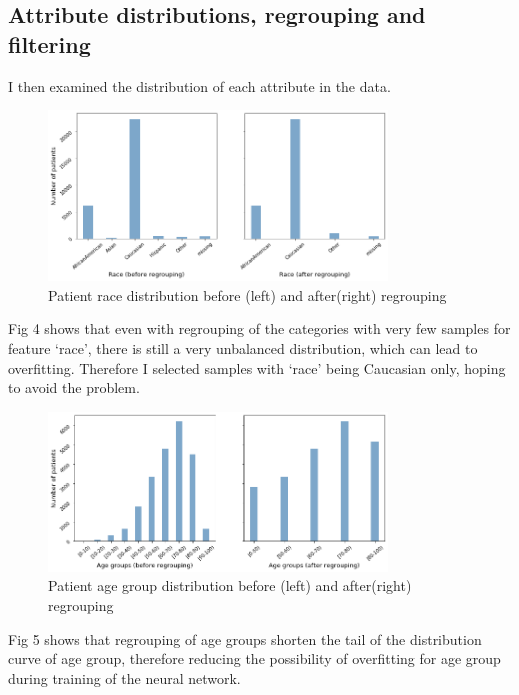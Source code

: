 \documentclass[letterpaper, 12 pt, conference]{ieeeconf}  %
\begin{document}
\subsection{Attribute distributions, regrouping and filtering}
I then examined the distribution of each attribute in the data. 
\begin{figure}[h]
  \includegraphics[width=9cm]{./figs/race_dist.png}
  \caption{Patient race distribution before (left) and after(right) regrouping}
  \label{fig:boat1}
\end{figure}\newline
Fig 4 shows that even with regrouping of the categories with very few samples for feature `race', there is still a very unbalanced distribution, which can lead to overfitting. Therefore I selected samples with `race' being Caucasian only, hoping to avoid the problem.\\\newline
\begin{figure}[h]
  \includegraphics[width=9cm]{./figs/age_dist.png}
  \caption{Patient age group distribution before (left) and after(right) regrouping}
  \label{fig:boat1}
\end{figure}\newline
Fig 5 shows that regrouping of age groups shorten the tail of the distribution curve of age group, therefore reducing the possibility of overfitting for age group during training of the neural network.\\
\end{document}
